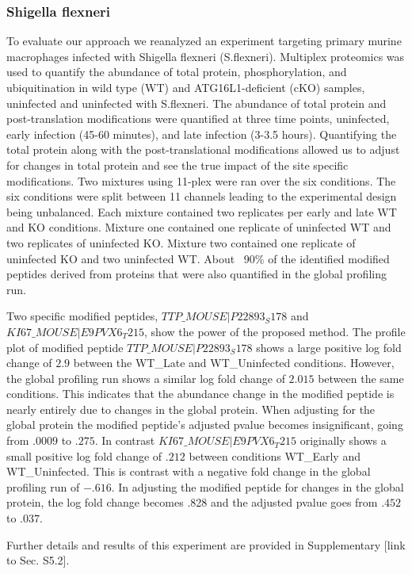 \documentclass[mcp]{article}
\numberwithin{figure}{section} %
\numberwithin{table}{section}
\def\todo#1{{\color{red}[#1]}}
\begin{document}
\subsubsection*{Shigella flexneri}
To evaluate our approach we reanalyzed an experiment targeting primary murine macrophages infected with Shigella flexneri (S.flexneri). \cite{Maculins} Multiplex proteomics was used to quantify the abundance of total protein, phosphorylation, and ubiquitination in wild type (WT) and ATG16L1-deficient (cKO) samples, uninfected and uninfected with S.flexneri. The abundance of total protein and post-translation modifications were quantified at three time points, uninfected, early infection (45-60 minutes), and late infection (3-3.5 hours). Quantifying the total protein along with the post-translational modifications allowed us to adjust for changes in total protein and see the true impact of the site specific modifications. Two mixtures using 11-plex were ran over the six conditions. The six conditions were split between 11 channels leading to the experimental design being unbalanced. Each mixture contained two replicates per early and late WT and KO conditions. Mixture one contained one replicate of uninfected WT and two replicates of uninfected KO. Mixture two contained one replicate of uninfected KO and two uninfected WT. About ~90\% of the identified modified peptides derived from proteins that were also quantified in the global profiling run.

Two specific modified peptides, $TTP\_MOUSE|P22893_S178$ and $KI67\_MOUSE|E9PVX6_T215$, show the power of the proposed method.  The profile plot of modified peptide $TTP\_MOUSE|P22893_S178$ shows a large positive log fold change of $2.9$ between the WT\_Late and WT\_Uninfected conditions. However, the global profiling run shows a similar log fold change of $2.015$ between  the same conditions. This indicates that the abundance change in the modified peptide is nearly entirely due to changes in the global protein. When adjusting for the global protein the modified peptide's adjusted pvalue becomes insignificant, going from $.0009$ to $.275$. In contrast $KI67\_MOUSE|E9PVX6_T215$ originally shows a small positive log fold change of $.212$ between conditions WT\_Early and WT\_Uninfected. This is contrast with a negative fold change in the global profiling run of $-.616$. In adjusting the modified peptide for changes in the global protein, the log fold change becomes .828 and the adjusted pvalue goes from $.452$ to $.037$.

Further details and results of this experiment are provided in Supplementary \todo{link to Sec. S5.2}. 
\end{document}
